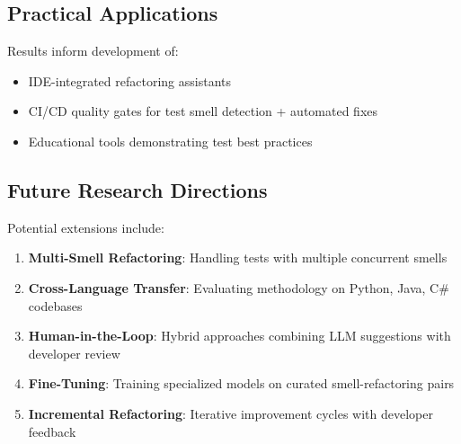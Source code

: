 \subsection{Practical Applications}

Results inform development of:
\begin{itemize}
    \item IDE-integrated refactoring assistants
    \item CI/CD quality gates for test smell detection + automated fixes
    \item Educational tools demonstrating test best practices
\end{itemize}

\subsection{Future Research Directions}

Potential extensions include:
\begin{enumerate}
    \item \textbf{Multi-Smell Refactoring}: Handling tests with multiple concurrent smells
    \item \textbf{Cross-Language Transfer}: Evaluating methodology on Python, Java, C\# codebases
    \item \textbf{Human-in-the-Loop}: Hybrid approaches combining LLM suggestions with developer review
    \item \textbf{Fine-Tuning}: Training specialized models on curated smell-refactoring pairs
    \item \textbf{Incremental Refactoring}: Iterative improvement cycles with developer feedback
\end{enumerate}
